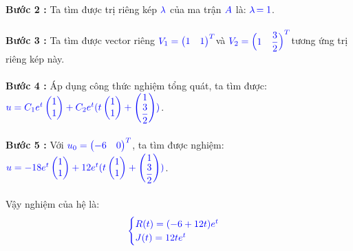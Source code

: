 \documentclass[a4paper]{article}
\begin{document}
{\bfseries Bước 2 :} Ta tìm được trị riêng kép $\textcolor{blue}{\lambda}$ của ma trận $\textcolor{blue}{A}$ là: $\textcolor{blue}{\lambda}$$\textcolor{blue}{=1}$.\\\\
{\bfseries Bước 3 :} Ta tìm được vector riêng \enskip $\textcolor{blue}{V\sb{1} = \begin{pmatrix} 1 & 1 \end{pmatrix}\sp{T}}$\enskip và \enskip $\textcolor{blue}{V\sb{2} = \begin{pmatrix} 1 & \dfrac{3}{2} \end{pmatrix}\sp{T}}$\enskip tương ứng trị riêng kép này.\\\\
{\bfseries Bước 4 :} Áp dụng công thức nghiệm tổng quát, ta tìm được:
$\textcolor{blue}{u = C\sb{1} e\sp{t}\begin{pmatrix} 1 \\ 1 \end{pmatrix} + C\sb{2} e\sp{t}(t\begin{pmatrix} 1 \\ 1 \end{pmatrix} + \begin{pmatrix} 1 \\ \dfrac{3}{2} \end{pmatrix})}$.\\\\
{\bfseries Bước 5 :} Với $\textcolor{blue}{u\sb{0} = \begin{pmatrix} -6 & 0 \end{pmatrix}\sp{T}}$, ta tìm được nghiệm: $\textcolor{blue}{u = -18 e\sp{t}\begin{pmatrix} 1 \\ 1 \end{pmatrix} + 12 e\sp{t}(t\begin{pmatrix} 1 \\ 1 \end{pmatrix} + \begin{pmatrix} 1 \\ \dfrac{3}{2} \end{pmatrix})}$.\\\\
Vậy nghiệm của hệ là:
\begin{align}
	    \textcolor{blue}{
	    \begin{cases}
            R(t)=(-6+12t)e\sp{t}\\
            J(t)=12te\sp{t}
        \end{cases}
        }
\notag
	\end{align}
\end{document}
